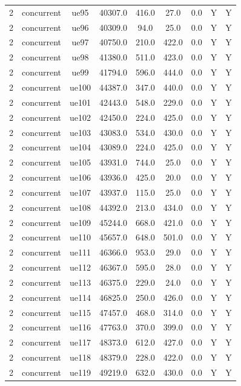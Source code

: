 \begin{table}[ht]
\begin{tabular}{|c|c|c|c|c|c|c|c|c|}
2 & concurrent & ue95 & 40307.0 & 416.0 & 27.0 & 0.0 & Y & Y \\
2 & concurrent & ue96 & 40309.0 & 94.0 & 25.0 & 0.0 & Y & Y \\
2 & concurrent & ue97 & 40750.0 & 210.0 & 422.0 & 0.0 & Y & Y \\
2 & concurrent & ue98 & 41380.0 & 511.0 & 423.0 & 0.0 & Y & Y \\
2 & concurrent & ue99 & 41794.0 & 596.0 & 444.0 & 0.0 & Y & Y \\
2 & concurrent & ue100 & 44387.0 & 347.0 & 440.0 & 0.0 & Y & Y \\
2 & concurrent & ue101 & 42443.0 & 548.0 & 229.0 & 0.0 & Y & Y \\
2 & concurrent & ue102 & 42450.0 & 224.0 & 425.0 & 0.0 & Y & Y \\
2 & concurrent & ue103 & 43083.0 & 534.0 & 430.0 & 0.0 & Y & Y \\
2 & concurrent & ue104 & 43089.0 & 224.0 & 425.0 & 0.0 & Y & Y \\
2 & concurrent & ue105 & 43931.0 & 744.0 & 25.0 & 0.0 & Y & Y \\
2 & concurrent & ue106 & 43936.0 & 425.0 & 20.0 & 0.0 & Y & Y \\
2 & concurrent & ue107 & 43937.0 & 115.0 & 25.0 & 0.0 & Y & Y \\
2 & concurrent & ue108 & 44392.0 & 213.0 & 434.0 & 0.0 & Y & Y \\
2 & concurrent & ue109 & 45244.0 & 668.0 & 421.0 & 0.0 & Y & Y \\
2 & concurrent & ue110 & 45657.0 & 648.0 & 501.0 & 0.0 & Y & Y \\
2 & concurrent & ue111 & 46366.0 & 953.0 & 29.0 & 0.0 & Y & Y \\
2 & concurrent & ue112 & 46367.0 & 595.0 & 28.0 & 0.0 & Y & Y \\
2 & concurrent & ue113 & 46375.0 & 229.0 & 24.0 & 0.0 & Y & Y \\
2 & concurrent & ue114 & 46825.0 & 250.0 & 426.0 & 0.0 & Y & Y \\
2 & concurrent & ue115 & 47457.0 & 468.0 & 314.0 & 0.0 & Y & Y \\
2 & concurrent & ue116 & 47763.0 & 370.0 & 399.0 & 0.0 & Y & Y \\
2 & concurrent & ue117 & 48373.0 & 612.0 & 427.0 & 0.0 & Y & Y \\
2 & concurrent & ue118 & 48379.0 & 228.0 & 422.0 & 0.0 & Y & Y \\
2 & concurrent & ue119 & 49219.0 & 632.0 & 430.0 & 0.0 & Y & Y \\

\end{tabular}
\end{table}
